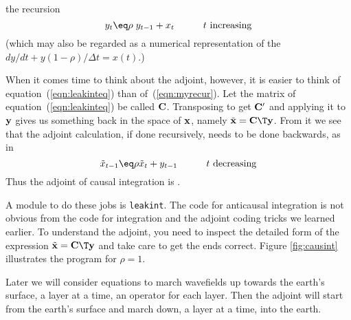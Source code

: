 the recursion
\begin{equation}
y_t \eq \rho\; y_{t-1} + x_t
\quad
\quad
\quad t\ {\rm increasing}
\label{eqn:myrecur}
\end{equation}
(which may also be regarded as a numerical representation
of the  $dy/dt+y (1-\rho)/\Delta t=x(t)$.)
\par
When it comes time to think about the adjoint, however,
it is easier to think of equation~(\ref{eqn:leakinteq}) than of~(\ref{eqn:myrecur}).
Let the matrix of equation~(\ref{eqn:leakinteq}) be called $\bold C$.
Transposing to get $\bold C '$ and applying it to $\bold y$
gives us something back in the space of $\bold x$,
namely $\tilde{\bold x} = \bold C\T \bold y$.
From it we see that the adjoint calculation,
if done recursively,
needs to be done backwards, as in
\begin{equation}
\tilde x_{t-1} \eq \rho \tilde x_{t} + y_{t-1}
\quad
\quad
\quad t \ {\rm decreasing}
\label{eqn:backrecur}
\end{equation}
Thus the adjoint of causal integration
is .
\par
A module to do these jobs is \texttt{leakint}.
The code for anticausal integration is not obvious
from the code for integration and the adjoint coding tricks we
learned earlier.
To understand the adjoint, you need to inspect
the detailed form of the expression $\tilde{\bold x} = \bold C\T \bold y$
and take care to get the ends correct.
Figure \ref{fig:causint} illustrates the program for $\rho = 1$.
\par
\par
Later we will consider equations
to march wavefields up towards the earth's surface,
a layer at a time, an operator for each layer.
Then the adjoint will start from the earth's surface
and march down, a layer at a time, into the earth.

